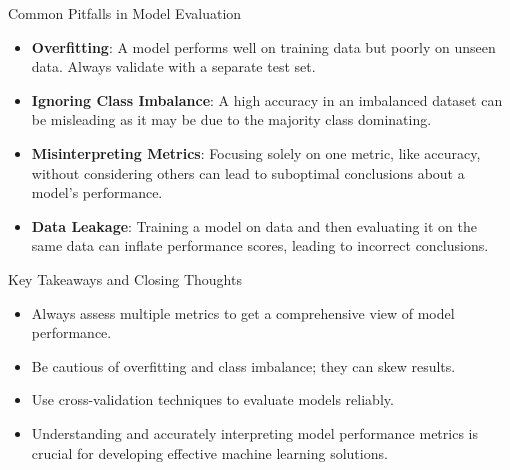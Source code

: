 \documentclass[aspectratio=169]{beamer}
\begin{document}
\begin{frame}[fragile]{Common Pitfalls in Model Evaluation}
    \begin{itemize}
        \item \textbf{Overfitting}: A model performs well on training data but poorly on unseen data. Always validate with a separate test set.
        
        \item \textbf{Ignoring Class Imbalance}: A high accuracy in an imbalanced dataset can be misleading as it may be due to the majority class dominating.
        
        \item \textbf{Misinterpreting Metrics}: Focusing solely on one metric, like accuracy, without considering others can lead to suboptimal conclusions about a model’s performance.
        
        \item \textbf{Data Leakage}: Training a model on data and then evaluating it on the same data can inflate performance scores, leading to incorrect conclusions.
    \end{itemize}
\end{frame}

\begin{frame}[fragile]{Key Takeaways and Closing Thoughts}
    \begin{itemize}
        \item Always assess multiple metrics to get a comprehensive view of model performance.
        
        \item Be cautious of overfitting and class imbalance; they can skew results.
        
        \item Use cross-validation techniques to evaluate models reliably.
        
        \item Understanding and accurately interpreting model performance metrics is crucial for developing effective machine learning solutions.
    \end{itemize}
\end{frame}
\end{document}
